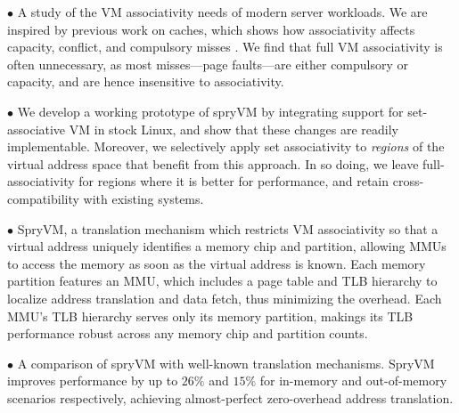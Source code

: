 \noindent $\bullet$ A study of the VM associativity needs of modern
server workloads. We are inspired by previous work on caches, which
shows how associativity affects capacity, conflict, and compulsory
misses \cite{hill:case}.  We find that full VM associativity is often
unnecessary, as most misses---page faults---are either compulsory or
capacity, and are hence insensitive to associativity. 

\noindent $\bullet$ We develop a working prototype of spryVM by
integrating support for set-associative VM in stock Linux, and show
that these changes are readily implementable. Moreover, we selectively
apply set associativity to {\it regions} of the virtual address space
that benefit from this approach. In so doing, we leave
full-associativity for regions where it is better for performance, and
retain cross-compatibility with existing systems.

\noindent $\bullet$ SpryVM, a translation mechanism which restricts VM
associativity so that a virtual address uniquely identifies a memory
chip and partition, allowing MMUs to access the memory as soon as the
virtual address is known. Each memory partition features an MMU, which
includes a page table and TLB hierarchy to localize address
translation and data fetch, thus minimizing the overhead. Each MMU's
TLB hierarchy serves only its memory partition, makings its TLB
performance robust across any memory chip and partition counts.

\noindent $\bullet$ A comparison of spryVM with well-known translation
mechanisms. SpryVM improves performance by up to $26\%$ and $15\%$ for
in-memory and out-of-memory scenarios respectively, achieving
almost-perfect zero-overhead address translation.

